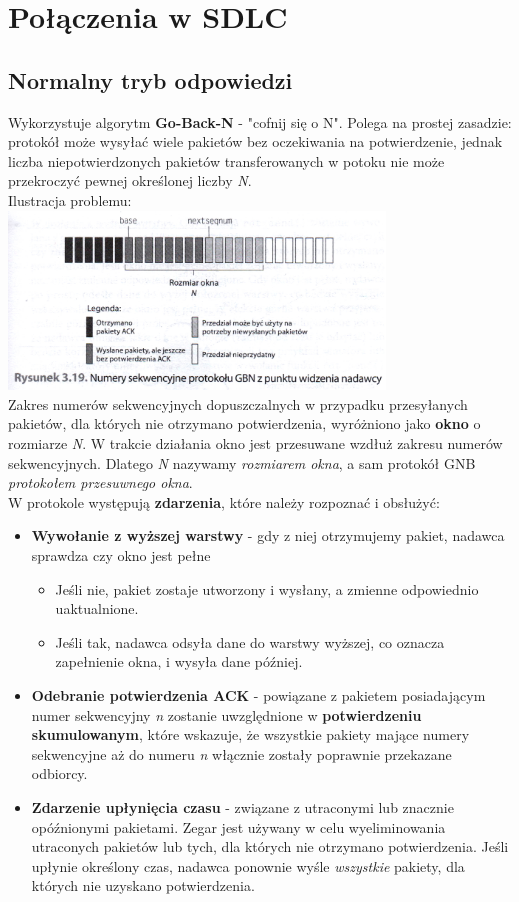 	\section{Połączenia w SDLC}
		\subsection{Normalny tryb odpowiedzi}
			Wykorzystuje algorytm \textbf{Go-Back-N} - "cofnij się o N". Polega na prostej zasadzie: protokół może wysyłać wiele pakietów bez oczekiwania na potwierdzenie, jednak liczba niepotwierdzonych pakietów transferowanych w potoku nie może przekroczyć pewnej określonej liczby \emph{N}.\\
			Ilustracja problemu:\\
			\includegraphics[width=10cm]{./images/image13.jpg}\\
			Zakres numerów sekwencyjnych dopuszczalnych w przypadku przesyłanych pakietów, dla których nie otrzymano potwierdzenia, wyróżniono jako \textbf{okno} o rozmiarze \emph{N}. W trakcie działania okno jest przesuwane wzdłuż zakresu numerów sekwencyjnych. Dlatego \emph{N} nazywamy \textit{rozmiarem okna}, a sam protokół GNB \textit{protokołem przesuwnego okna}.\\
			W protokole występują \textbf{zdarzenia}, które należy rozpoznać i obsłużyć:
			\begin{itemize}
				\item \textbf{Wywołanie z wyższej warstwy} - gdy z niej otrzymujemy pakiet, nadawca sprawdza czy okno jest pełne
				\begin{itemize}
					\item Jeśli nie, pakiet zostaje utworzony i wysłany, a zmienne odpowiednio uaktualnione.
					\item Jeśli tak, nadawca odsyła dane do warstwy wyższej, co oznacza zapełnienie okna, i wysyła dane później.
				\end{itemize}
				\item \textbf{Odebranie potwierdzenia ACK} - powiązane z pakietem posiadającym numer sekwencyjny \emph{n} zostanie uwzględnione w \textbf{potwierdzeniu skumulowanym}, które wskazuje, że wszystkie pakiety mające numery sekwencyjne aż do numeru \emph{n} włącznie zostały poprawnie przekazane odbiorcy.
				\item \textbf{Zdarzenie upłynięcia czasu} - związane z utraconymi lub znacznie opóźnionymi pakietami. Zegar jest używany w celu wyeliminowania utraconych pakietów lub tych, dla których nie otrzymano potwierdzenia. Jeśli upłynie określony czas, nadawca ponownie wyśle \emph{wszystkie} pakiety, dla których nie uzyskano potwierdzenia.
			\end{itemize}
